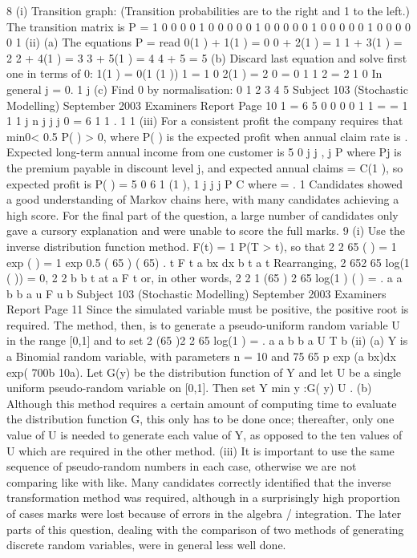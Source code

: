 8 (i) Transition graph:
(Transition probabilities are to the right and 1 to the left.)
The transition matrix is
P =
1 0 0 0 0
1 0 0 0 0
0 1 0 0 0
0 0 1 0 0
0 0 0 1 0
0 0 0 0 1
(ii) (a) The equations P = read
0(1 ) + 1(1 ) = 0
0 + 2(1 ) = 1
1 + 3(1 ) = 2
2 + 4(1 ) = 3
3 + 5(1 ) = 4
4 + 5 = 5
(b) Discard last equation and solve first one in terms of 0:
1(1 ) = 0(1 (1 ))
1 = 1 0
2(1 ) =
2
0 = 0
1 1
2 =
2
1 0
In general j = 0.
1
j
(c) Find 0 by normalisation:
0 1 2 3 4 5
Subject 103 (Stochastic Modelling) September 2003 Examiners Report
Page 10
1 =
6
5
0 0 0 0
1
1
= =
1 1
1
j
n
j j j
0 = 6
1
1 .
1
1
(iii) For a consistent profit the company requires that min0< 0.5 P( ) > 0, where
P( ) is the expected profit when annual claim rate is .
Expected long-term annual income from one customer is 5
0
j j , j
P where Pj
is the premium payable in discount level j, and expected annual claims
= C(1 ), so expected profit is
P( ) = 5
0 6
1
(1 ),
1
j
j j
P C where = .
1
Candidates showed a good understanding of Markov chains here, with many candidates achieving a
high score. For the final part of the question, a large number of candidates only gave a cursory
explanation and were unable to score the full marks.
9 (i) Use the inverse distribution function method.
F(t) = 1 P(T > t), so that
2 2
65
( ) = 1 exp ( ) = 1 exp 0.5 ( 65 ) ( 65) .
t
F t a bx dx b t a t
Rearranging,
2 652 65 log(1 ( )) = 0,
2 2
b b
t at a F t
or, in other words,
2 2
1 (65 ) 2 65 log(1 )
( ) = .
a a b b a u
F u
b
Subject 103 (Stochastic Modelling) September 2003 Examiners Report
Page 11
Since the simulated variable must be positive, the positive root is required.
The method, then, is to generate a pseudo-uniform random variable U in the
range [0,1] and to set
2 (65 )2 2 65 log(1 )
= .
a a b b a U
T
b
(ii) (a) Y is a Binomial random variable, with parameters n = 10 and
75
65
p exp (a bx)dx exp( 700b 10a).
Let G(y) be the distribution function of Y and let U be a single uniform
pseudo-random variable on [0,1]. Then set Y min y :G( y) U .
(b) Although this method requires a certain amount of computing time to
evaluate the distribution function G, this only has to be done once;
thereafter, only one value of U is needed to generate each value of Y,
as opposed to the ten values of U which are required in the other
method.
(iii) It is important to use the same sequence of pseudo-random numbers in each
case, otherwise we are not comparing like with like.
Many candidates correctly identified that the inverse transformation method was required, although
in a surprisingly high proportion of cases marks were lost because of errors in the algebra /
integration. The later parts of this question, dealing with the comparison of two methods of
generating discrete random variables, were in general less well done.
